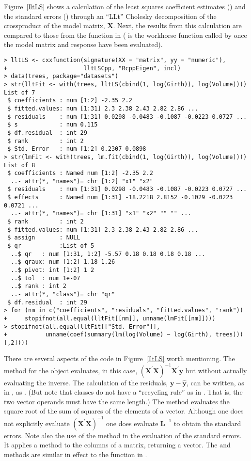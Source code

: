 \documentclass[shortnames,article,nojss]{jss}
\begin{document}
Figure~\ref{lltLS} shows a calculation of the least squares coefficient estimates
() and the standard errors () through an
``LLt'' Cholesky decomposition of the crossproduct of the model
matrix, $\bm X$.  Next, the results from this calculation are compared
to those from the  function in 
( is the workhorse function called by  once the
model matrix and response have been evaluated).
\begin{verbatim}
> lltLS <- cxxfunction(signature(XX = "matrix", yy = "numeric"), 
+                      lltLSCpp, "RcppEigen", incl)
> data(trees, package="datasets")
> str(lltFit <- with(trees, lltLS(cbind(1, log(Girth)), log(Volume))))
List of 7
 $ coefficients : num [1:2] -2.35 2.2
 $ fitted.values: num [1:31] 2.3 2.38 2.43 2.82 2.86 ...
 $ residuals    : num [1:31] 0.0298 -0.0483 -0.1087 -0.0223 0.0727 ...
 $ s            : num 0.115
 $ df.residual  : int 29
 $ rank         : int 2
 $ Std. Error   : num [1:2] 0.2307 0.0898
> str(lmFit <- with(trees, lm.fit(cbind(1, log(Girth)), log(Volume))))
List of 8
 $ coefficients : Named num [1:2] -2.35 2.2
  ..- attr(*, "names")= chr [1:2] "x1" "x2"
 $ residuals    : num [1:31] 0.0298 -0.0483 -0.1087 -0.0223 0.0727 ...
 $ effects      : Named num [1:31] -18.2218 2.8152 -0.1029 -0.0223 0.0721 ...
  ..- attr(*, "names")= chr [1:31] "x1" "x2" "" "" ...
 $ rank         : int 2
 $ fitted.values: num [1:31] 2.3 2.38 2.43 2.82 2.86 ...
 $ assign       : NULL
 $ qr           :List of 5
  ..$ qr   : num [1:31, 1:2] -5.57 0.18 0.18 0.18 0.18 ...
  ..$ qraux: num [1:2] 1.18 1.26
  ..$ pivot: int [1:2] 1 2
  ..$ tol  : num 1e-07
  ..$ rank : int 2
  ..- attr(*, "class")= chr "qr"
 $ df.residual  : int 29
> for (nm in c("coefficients", "residuals", "fitted.values", "rank"))
+     stopifnot(all.equal(lltFit[[nm]], unname(lmFit[[nm]])))
> stopifnot(all.equal(lltFit[["Std. Error"]],
+           unname(coef(summary(lm(log(Volume) ~ log(Girth), trees)))[,2])))
\end{verbatim}


There are several aspects of the  code in
Figure~\ref{lltLS} worth mentioning.  The  method for the
 object evaluates, in this case, $\left(\bm X^\prime\bm
  X\right)^{-1}\bm X^\prime\bm y$ but without actually evaluating the
inverse.  The calculation of the residuals, $\bm y-\widehat{\bm y}$,
can be written, as in , as . (But note
that  classes do not have a ``recycling rule'' as in
.  That is, the two vector operands must have the same
length.)  The  method evaluates the square root of the
sum of squares of the elements of a vector.  Although one does not
explicitly evaluate $\left(\bm X^\prime\bm X\right)^{-1}$ one does
evaluate $\bm L^{-1}$ to obtain the standard errors.  Note also the
use of the  method in the evaluation of the standard
errors.  It applies a method to the columns of a matrix, returning a
vector.  The   and  methods
are similar in effect to the  function in .
\end{document}
